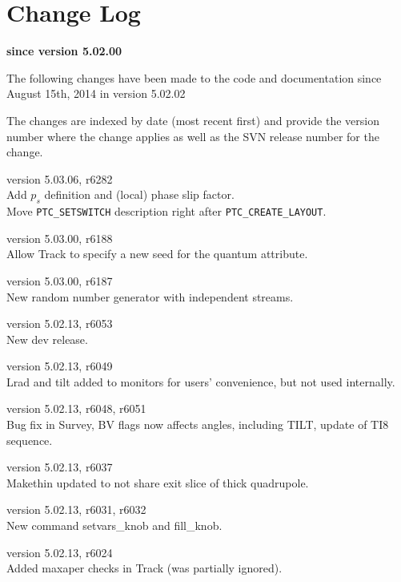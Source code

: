 \chapter*{Change Log}
\label{chap:changelog}

\begin{center} 
\textbf{since version 5.02.00}
\end{center}

The following changes have been made to the code and documentation since
August 15th, 2014 in version 5.02.02

The changes are indexed by date (most recent first) and provide the \madx 
version number where the change applies as well as the SVN 
release number for the change. 

\begin{madlist}
   version 5.03.06, r6282 \\
  Add $p_s$ definition and (local) phase slip factor. \\
 Move \texttt{PTC\_SETSWITCH} description right after \texttt{PTC\_CREATE\_LAYOUT}.

   version 5.03.00, r6188 \\
  Allow Track to specify a new seed for the quantum attribute.

   version 5.03.00, r6187 \\
  New random number generator with independent streams.

   version 5.02.13, r6053 \\
  New dev release.

   version 5.02.13, r6049 \\
  Lrad and tilt added to monitors for users' convenience, but not used internally.

   version 5.02.13, r6048, r6051 \\
  Bug fix in Survey, BV flags now affects angles, including TILT, update of TI8 sequence.
  
   version 5.02.13, r6037 \\
  Makethin updated to not share exit slice of thick quadrupole.
 
   version 5.02.13, r6031, r6032 \\
  New command setvars\_knob and fill\_knob.
  
   version 5.02.13, r6024 \\
  Added maxaper checks in Track (was partially ignored).


\end{madlist}
